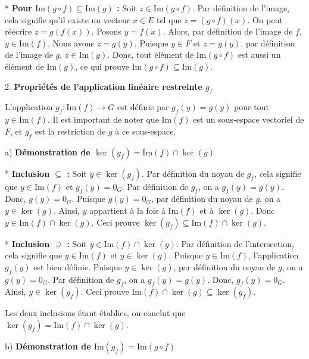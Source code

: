 \documentclass{report}
\begin{document}
    *   \textbf{Pour $\text{Im}(g \circ f) \subseteq \text{Im}(g)$ :}
        Soit $z \in \text{Im}(g \circ f)$. Par définition de l'image, cela signifie qu'il existe un vecteur $x \in E$ tel que $z = (g \circ f)(x)$.
        On peut réécrire $z = g(f(x))$.
        Posons $y = f(x)$. Alors, par définition de l'image de $f$, $y \in \text{Im}(f)$.
        Nous avons $z = g(y)$.
        Puisque $y \in F$ et $z = g(y)$, par définition de l'image de $g$, $z \in \text{Im}(g)$.
        Donc, tout élément de $\text{Im}(g \circ f)$ est aussi un élément de $\text{Im}(g)$, ce qui prouve $\text{Im}(g \circ f) \subseteq \text{Im}(g)$.

2.  \textbf{Propriétés de l'application linéaire restreinte $g_f$}

    L'application $g_f: \text{Im}(f) \to G$ est définie par $g_f(y) = g(y)$ pour tout $y \in \text{Im}(f)$.
    Il est important de noter que $\text{Im}(f)$ est un sous-espace vectoriel de $F$, et $g_f$ est la restriction de $g$ à ce sous-espace.

    a) \textbf{Démonstration de $\ker(g_f) = \text{Im}(f) \cap \ker(g)$}

        *   \textbf{Inclusion $\subseteq$ :}
            Soit $y \in \ker(g_f)$. Par définition du noyau de $g_f$, cela signifie que $y \in \text{Im}(f)$ et $g_f(y) = 0_G$.
            Par définition de $g_f$, on a $g_f(y) = g(y)$. Donc, $g(y) = 0_G$.
            Puisque $g(y) = 0_G$, par définition du noyau de $g$, on a $y \in \ker(g)$.
            Ainsi, $y$ appartient à la fois à $\text{Im}(f)$ et à $\ker(g)$. Donc $y \in \text{Im}(f) \cap \ker(g)$.
            Ceci prouve $\ker(g_f) \subseteq \text{Im}(f) \cap \ker(g)$.

        *   \textbf{Inclusion $\supseteq$ :}
            Soit $y \in \text{Im}(f) \cap \ker(g)$. Par définition de l'intersection, cela signifie que $y \in \text{Im}(f)$ et $y \in \ker(g)$.
            Puisque $y \in \text{Im}(f)$, l'application $g_f(y)$ est bien définie.
            Puisque $y \in \ker(g)$, par définition du noyau de $g$, on a $g(y) = 0_G$.
            Par définition de $g_f$, on a $g_f(y) = g(y)$. Donc, $g_f(y) = 0_G$.
            Ainsi, $y \in \ker(g_f)$.
            Ceci prouve $\text{Im}(f) \cap \ker(g) \subseteq \ker(g_f)$.

        Les deux inclusions étant établies, on conclut que $\ker(g_f) = \text{Im}(f) \cap \ker(g)$.

    b) \textbf{Démonstration de $\text{Im}(g_f) = \text{Im}(g \circ f)$}
\end{document}
